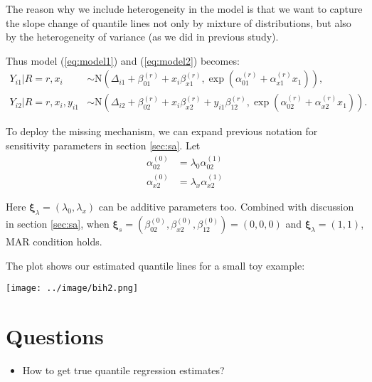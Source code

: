 \documentclass[12pt]{article}
\begin{document}
The reason why we include heterogeneity in the model is that we want
to capture the slope change of quantile lines not only by mixture of
distributions, but also by the heterogeneity of variance (as we did in
previous study).

Thus model (\ref{eq:model1}) and (\ref{eq:model2}) becomes:
\begin{align*}
  Y_{i1}|R = r, x_i &\sim \textrm{N}(\Delta_{i1} + \beta_{01}^{(r)} + x_i\beta_{x1}^{(r)}, \exp(\alpha_{01}^{(r)} + \alpha_{x1}^{(r)} x_1)),\\
  Y_{i2}|R = r, x_i, y_{i1} & \sim \textrm{N}(\Delta_{i2} + \beta_{02}^{(r)} +
  x_i\beta_{x2}^{(r)} + y_{i1}\beta_{12}^{(r)}, \exp(\alpha_{02}^{(r)}
  + \alpha_{x2}^{(r)} x_1 )).
\end{align*}

To deploy the missing mechanism, we can expand previous notation for
sensitivity parameters in section \ref{sec:sa}. Let
\begin{align*}
  \alpha_{02}^{(0)} & = \lambda_0 \alpha_{02}^{(1)} \\
  \alpha_{x2}^{(0)} & = \lambda_x \alpha_{x2}^{(1)}
\end{align*}

Here $\bm \xi_{\lambda} = (\lambda_0, \lambda_x) $ can be additive parameters too. Combined
with discussion in section \ref{sec:sa}, when $\bm \xi_s =
(\beta_{02}^{(0)} , \beta_{x2}^{(0)}, \beta_{12}^{(0)}) = (0, 0, 0) $
and $\bm \xi_{\lambda} = (1, 1)$, MAR condition holds.

The plot shows our estimated quantile lines for a small toy example:

\centering
\texttt{[image: ../image/bih2.png]}

\section{Questions}
 
\begin{itemize}
\item How to get true quantile regression estimates?  
\end{itemize}
\end{document}
